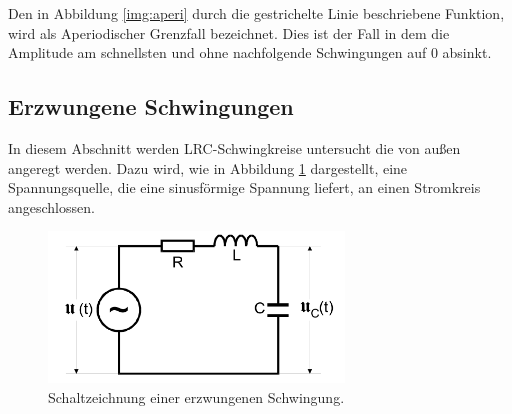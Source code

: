         \noindent Den in Abbildung \ref{img:aperi} durch die gestrichelte Linie beschriebene Funktion, wird als Aperiodischer Grenzfall 
        bezeichnet. Dies ist der Fall in dem die Amplitude am schnellsten und ohne nachfolgende Schwingungen auf 0 absinkt.




    \subsection{Erzwungene Schwingungen}
    

    \noindent In diesem Abschnitt werden LRC-Schwingkreise untersucht die von außen angeregt werden. 
    Dazu wird, wie in Abbildung \ref{img:erz} dargestellt,
    eine Spannungsquelle, die eine sinusförmige Spannung liefert, an einen Stromkreis angeschlossen.
    
    \begin{figure}[H]
        \centering
        \includegraphics[width=0.7\textwidth]{images/Erzwungene.PNG}
        \caption{Schaltzeichnung einer erzwungenen Schwingung\protect \cite{V354}.}
        \label{img:erz}
    \end{figure}

